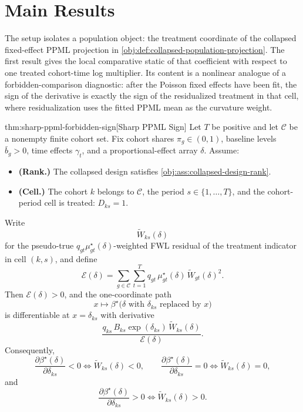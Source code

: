 \documentclass[11pt]{article}
\begin{document}
\section{Main Results}

The setup isolates a population object: the treatment coordinate of the collapsed fixed-effect PPML projection in \cref{obj:def:collapsed-population-projection}. The first result gives the local comparative static of that coefficient with respect to one treated cohort-time log multiplier. Its content is a nonlinear analogue of a forbidden-comparison diagnostic: after the Poisson fixed effects have been fit, the sign of the derivative is exactly the sign of the residualized treatment in that cell, where residualization uses the fitted PPML mean as the curvature weight.

\begin{theoremv}{thm:sharp-ppml-forbidden-sign}[Sharp PPML Sign]
Let \(T\) be positive and let \(\mathcal C\) be a nonempty finite cohort set. Fix cohort shares \(\pi_g\in(0,1)\), baseline levels \(\bar b_g>0\), time effects \(\gamma_t\), and a proportional-effect array \(\delta\). Assume:
\begin{itemize}
\item \textbf{(Rank.)} The collapsed design satisfies \cref{obj:ass:collapsed-design-rank}.
\item \textbf{(Cell.)} The cohort \(k\) belongs to \(\mathcal C\), the period \(s\in\{1,\ldots,T\}\), and the cohort-period cell is treated: \(D_{ks}=1\).
\end{itemize}
Write
\[
\widetilde W_{ks}(\delta)
\]
for the pseudo-true \(q_{gt}\mu^\star_{gt}(\delta)\)-weighted FWL residual of the treatment indicator in cell \((k,s)\), and define
\[
\mathcal E(\delta)
=
\sum_{g\in\mathcal C}\sum_{t=1}^T
q_{gt}\,\mu^\star_{gt}(\delta)\,
\widetilde W_{gt}(\delta)^2 .
\]
Then \(\mathcal E(\delta)>0\), and the one-coordinate path
\[
x\mapsto \beta^\star\!\bigl(\delta \text{ with } \delta_{ks}\text{ replaced by }x\bigr)
\]
is differentiable at \(x=\delta_{ks}\) with derivative
\[
\frac{
q_{ks}\,B_{ks}\exp(\delta_{ks})\,\widetilde W_{ks}(\delta)
}{
\mathcal E(\delta)
}.
\]
Consequently,
\[
\frac{\partial \beta^\star(\delta)}{\partial \delta_{ks}}<0
\iff
\widetilde W_{ks}(\delta)<0,\qquad
\frac{\partial \beta^\star(\delta)}{\partial \delta_{ks}}=0
\iff
\widetilde W_{ks}(\delta)=0,
\]
and
\[
\frac{\partial \beta^\star(\delta)}{\partial \delta_{ks}}>0
\iff
\widetilde W_{ks}(\delta)>0.
\]
\end{theoremv}
\end{document}
